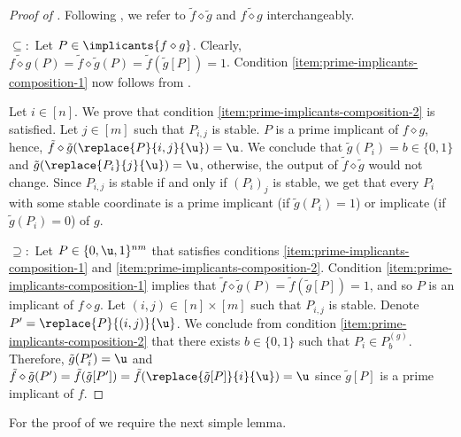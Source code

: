 \documentclass[acmsmall, nonacm, authorversion]{acmart}
\begin{document}
\begin{proof}[Proof of ]
Following , we refer to $\tilde{f}\diamond\tilde{g}$ and $\widetilde{f\diamond g}$ interchangeably.

$\subseteq:$ Let $P\in \implicants{f\diamond g}$. Clearly, $\widetilde{f\diamond g}(P)=\tilde{f}\diamond\tilde{g}(P)=\tilde{f}(\tilde{g}[P])=1$. Condition \ref{item:prime-implicants-composition-1} now follows from .

Let $i\in [n]$. We prove that condition \ref{item:prime-implicants-composition-2} is satisfied. Let $j\in [m]$ such that $P_{i,j}$ is stable. $P$ is a prime implicant of $f\diamond g$, hence, $\tilde{f}\diamond\tilde{g}(\replace{P}{i,j}{\u})=\u$. We conclude that $\tilde{g}(P_i)=b\in\{0,1\}$ and $\tilde{g}(\replace{P_i}{j}{\u})=\u$, otherwise, the output of $\tilde{f}\diamond\tilde{g}$ would not change. Since $P_{i,j}$ is stable if and only if $(P_i)_j$ is stable, we get that every $P_i$ with some stable coordinate is a prime implicant (if $\tilde{g}(P_i)=1$) or implicate (if $\tilde{g}(P_i)=0$) of $g$. 

$\supseteq:$ Let $P\in \{0,\u,1\}^{nm}$  that satisfies conditions \ref{item:prime-implicants-composition-1} and \ref{item:prime-implicants-composition-2}. Condition \ref{item:prime-implicants-composition-1} implies that $\tilde{f}\diamond \tilde{g}(P)=\tilde{f}(\tilde{g}[P])=1$, and so $P$ is an implicant of $f\diamond g$. Let $(i,j)\in [n] \times [m]$ such that $P_{i,j}$ is stable. Denote $P'=\replace{P}{(i,j)}{\u}$. We conclude from condition \ref{item:prime-implicants-composition-2} that there exists $b\in\{0,1\}$ such that $P_i\in P_{b}^{(g)}$. Therefore, $\tilde{g}(P'_i)=\u$ and $\tilde{f}\diamond \tilde{g}(P')=\tilde{f}(\tilde{g}[P'])=\tilde{f}(\replace{\tilde{g}[P]}{i}{\u})=\u$ since $\tilde{g}[P]$ is a prime implicant of $f$.
\end{proof}

For the proof of  we require the next simple lemma.
\end{document}
